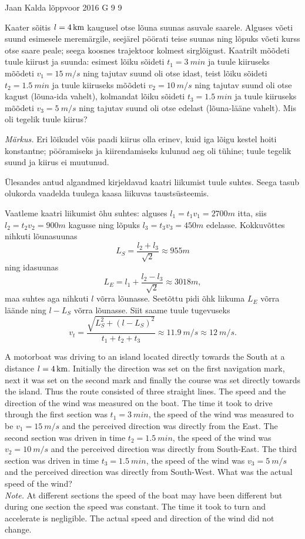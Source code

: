 {Jaan Kalda} %
{lõppvoor} %
{2016} %
{G 9} %
{9} %
{
\ifStatement
Kaater sõitis $l=\SI 4{km}$ kaugusel otse lõuna suunas asuvale saarele. 
Alguses võeti suund esimesele meremärgile, seejärel pöörati teise suunas ning lõpuks võeti kurss otse saare peale; seega koosnes trajektoor kolmest sirglõigust. Kaatrilt mõõdeti tuule kiirust ja suunda: esimest lõiku sõideti $t_1=\SI{3}{min}$ ja tuule kiiruseks mõõdeti $v_1=\SI{15}{m/s}$ ning tajutav suund oli otse idast, teist lõiku sõideti $t_2=\SI{1,5}{min}$ ja tuule kiiruseks mõõdeti $v_2=\SI{10}{m/s}$ ning tajutav suund oli otse kagust (lõuna-ida vahelt), kolmandat lõiku sõideti $t_3=\SI{1,5}{min}$ ja tuule kiiruseks mõõdeti $v_3=\SI{5}{m/s}$ ning tajutav suund oli otse edelast (lõuna-lääne vahelt). Mis oli tegelik tuule kiirus?

\emph{Märkus.} Eri lõikudel võis paadi kiirus olla erinev, kuid iga lõigu kestel hoiti konstantne; pööramiseks ja kiirendamiseks kulunud aeg oli tühine; tuule tegelik suund ja kiirus ei muutunud. 
\fi


\ifHint
Ülesandes antud algandmed kirjeldavad kaatri liikumist tuule suhtes. Seega tasub olukorda vaadelda tuulega kaasa liikuvas taustsüsteemis.
\fi


\ifSolution
Vaatleme kaatri liikumist õhu suhtes: alguses $l_1=t_1v_1=\SI{2700}m$ itta, siis $l_2=t_2v_2=\SI{900}m$ kagusse
ning lõpuks $l_3=t_3v_3=\SI{450}m$ edelasse. Kokkuvõttes nihkuti lõunasuunas 
\[
L_S=\frac{l_2+l_3}{\sqrt 2}\approx \SI{955}m
\]
ning idasuunas
\[
L_E=l_1+\frac{l_2-l_3}{\sqrt 2}\approx \SI{3018}m,
\]
maa suhtes aga nihkuti $l$ võrra lõunasse. Seetõttu pidi õhk liikuma $L_E$ võrra läände ning $l-L_S$ võrra lõunasse. Siit saame tuule tugevuseks 
$$v_t=\frac{\sqrt{L_S^2+(l-L_S)^2}}{t_1+t_2+t_3}\approx \SI{11.9}{m/s}\approx \SI{12}{m/s}.$$ 
\fi


\ifEngStatement
A motorboat was driving to an island located directly towards the South at a distance $l=\SI 4{km}$. Initially the direction was set on the first navigation mark, next it was set on the second mark and finally the course was set directly towards the island. Thus the route consisted of three straight lines. The speed and the direction of the wind was measured on the boat. The time it took to drive through the first section was $t_1=\SI{3}{min}$, the speed of the wind was measured to be $v_1=\SI{15}{m/s}$ and the perceived direction was directly from the East. The second section was driven in time $t_2=\SI{1,5}{min}$, the speed of the wind was $v_2=\SI{10}{m/s}$ and the perceived direction was directly from South-East. The third section was driven in time $t_3=\SI{1,5}{min}$, the speed of the wind was $v_3=\SI{5}{m/s}$ and the perceived direction was directly from South-West. What was the actual speed of the wind?\\
\emph{Note.} At different sections the speed of the boat may have been different but during one section the speed was constant. The time it took to turn and accelerate is negligible. The actual speed and direction of the wind did not change.
\fi


}
